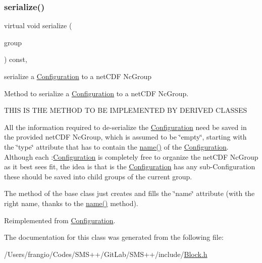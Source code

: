 \subsubsection{\texorpdfstring{serialize()}{serialize()}\hspace{0.1cm}{\footnotesize\ttfamily [2/2]}}
{\footnotesize\ttfamily virtual void serialize (\begin{DoxyParamCaption}\item[{net\+C\+D\+F\+::\+Nc\+Group \&\&}]{group }\end{DoxyParamCaption}) const\hspace{0.3cm}{\ttfamily [override]}, {\ttfamily [virtual]}}



serialize a \mbox{\hyperlink{class_s_m_spp__di__unipi__it_1_1_configuration}{Configuration}} to a net\+C\+DF Nc\+Group 

Method to serialize a \mbox{\hyperlink{class_s_m_spp__di__unipi__it_1_1_configuration}{Configuration}} to a net\+C\+DF Nc\+Group. \begin{DoxyVerb}THIS IS THE METHOD TO BE IMPLEMENTED BY DERIVED CLASSES
\end{DoxyVerb}


All the information required to de-\/serialize the \mbox{\hyperlink{class_s_m_spp__di__unipi__it_1_1_configuration}{Configuration}} need be saved in the provided net\+C\+DF Nc\+Group, which is assumed to be \char`\"{}empty\char`\"{}, starting with the \char`\"{}type\char`\"{} attribute that has to contain the \mbox{\hyperlink{class_s_m_spp__di__unipi__it_1_1_configuration_a738e9dfd6e00507da219e4bd5a3f6be9}{name()}} of the \mbox{\hyperlink{class_s_m_spp__di__unipi__it_1_1_configuration}{Configuration}}. Although each \+:\mbox{\hyperlink{class_s_m_spp__di__unipi__it_1_1_configuration}{Configuration}} is completely free to organize the net\+C\+DF Nc\+Group as it best sees fit, the idea is that is the \mbox{\hyperlink{class_s_m_spp__di__unipi__it_1_1_configuration}{Configuration}} has any sub-\/\+Configuration these should be saved into child groups of the current group.

The method of the base class just creates and fills the \char`\"{}name\char`\"{} attribute (with the right name, thanks to the \mbox{\hyperlink{class_s_m_spp__di__unipi__it_1_1_configuration_a738e9dfd6e00507da219e4bd5a3f6be9}{name()}} method). 

Reimplemented from \mbox{\hyperlink{class_s_m_spp__di__unipi__it_1_1_configuration_a59f3f59d72c56028f06c555bdcd36caf}{Configuration}}.



The documentation for this class was generated from the following file\+:\begin{DoxyCompactItemize}
\item 
/\+Users/frangio/\+Codes/\+S\+M\+S++/\+Git\+Lab/\+S\+M\+S++/include/\mbox{\hyperlink{_block_8h}{Block.\+h}}\end{DoxyCompactItemize}
